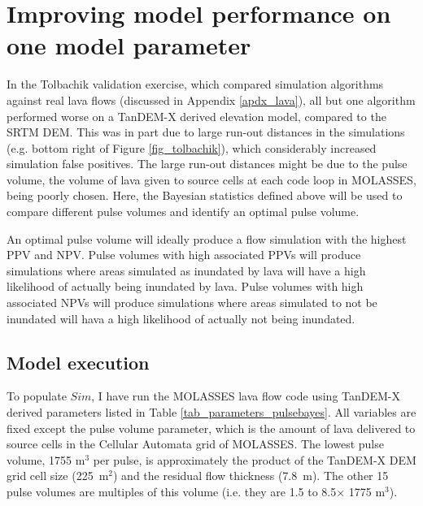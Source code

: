 	\section{Improving model performance on one model parameter}\label{sec_bayespulse}
	In the Tolbachik validation exercise, which compared simulation algorithms against real lava flows (discussed in Appendix \ref{apdx_lava}), all but one algorithm performed worse on a TanDEM-X derived elevation model, compared to the SRTM DEM. This was in part due to large run-out distances in the simulations (e.g. bottom right of Figure \ref{fig_tolbachik}), which considerably increased simulation false positives. The large run-out distances might be due to the pulse volume, the volume of lava given to source cells at each code loop in MOLASSES, being poorly chosen. Here, the Bayesian statistics defined above will be used to compare different pulse volumes and identify an optimal pulse volume. 
		
		An optimal pulse volume will ideally produce a flow simulation with the highest PPV and NPV. Pulse volumes with high associated PPVs will produce simulations where areas simulated as inundated by lava will have a high likelihood of actually being inundated by lava. Pulse volumes with high associated NPVs will produce simulations where areas simulated to not be inundated will hava a high likelihood of actually not being inundated.
		
		\subsection{Model execution} 
		To populate $Sim$, I have run the MOLASSES lava flow code using TanDEM-X derived parameters listed in Table \ref{tab_parameters_pulsebayes}. All variables are fixed except the pulse volume parameter, which is the amount of lava delivered to source cells in the Cellular Automata grid of MOLASSES. The lowest pulse volume, 1755 m$^3$ per pulse, is approximately the product of the TanDEM-X DEM grid cell size (225~m$^2$) and the residual flow thickness (7.8~m). The other 15 pulse volumes are multiples of this volume (i.e. they are 1.5 to 8.5$\times$ 1775 m$^3$).
		
